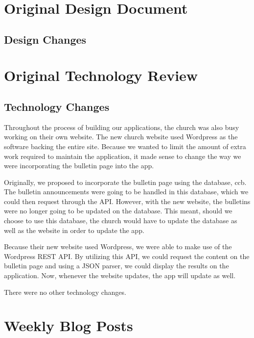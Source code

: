 \documentclass[letterpaper,10pt,draftclsnofoot,onecolumn,titlepage]{IEEEtran}
\begin{document}
\section{Original Design Document}

	

	\subsection{Design Changes}

\section{Original Technology Review}

	

	\subsection{Technology Changes}
	Throughout the process of building our applications, the church was also busy working on their own website.
	The new church website used Wordpress as the software backing the entire site.
	Because we wanted to limit the amount of extra work required to maintain the application, it made sense to change the way we were incorporating the bulletin page into the app.

	Originally, we proposed to incorporate the bulletin page using the database, \gls{ccb}.
	The bulletin announcements were going to be handled in this database, which we could then request through the API.
	However, with the new website, the bulletins were no longer going to be updated on the database.
	This meant, should we choose to use this database, the church would have to update the database as well as the website in order to update the app.

	Because their new website used Wordpress, we were able to make use of the Wordpress REST API.
	By utilizing this API, we could request the content on the bulletin page and using a JSON parser, we could display the results on the application.
	Now, whenever the website updates, the app will update as well.

	There were no other technology changes.

\section{Weekly Blog Posts}
\end{document}
